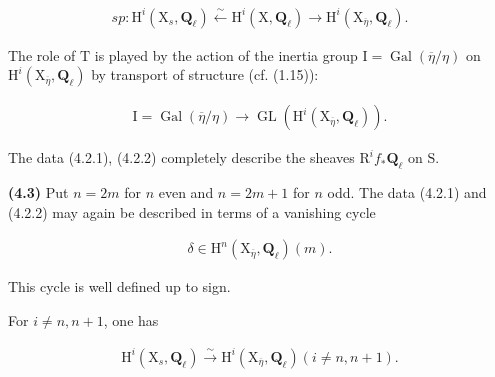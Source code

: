 \documentclass[10pt,leqno]{article}
\begin{document}
\begin{equation*}\begin{gathered}\mathit{sp} : \mathrm{H}^{i}(\mathrm{X}_{s},\mathbf{Q}_{\ell }) \xleftarrow{\sim } \mathrm{H}^{i}(\mathrm{X},\mathbf{Q}_{\ell }) \longrightarrow  \mathrm{H}^{i}(\mathrm{X}_{\overline{\eta }},\mathbf{Q}_{\ell }).\end{gathered}\tag{4.2.1}\end{equation*}

\noindent The role of \(\mathrm{T}\) is played by the action of the inertia group \(\mathrm{I}=\operatorname{Gal}(\overline{\eta }/\eta )\) on \(\mathrm{H}^{i}(\mathrm{X}_{\overline{\eta }},\mathbf{Q}_{\ell })\) by transport of structure (cf. (1.15)):\par

\begin{equation*}\begin{gathered}\mathrm{I}=\operatorname{Gal}(\overline{\eta }/\eta ) \longrightarrow  \operatorname{GL}(\mathrm{H}^{i}(\mathrm{X}_{\overline{\eta }},\mathbf{Q}_{\ell })).\end{gathered}\tag{4.2.2}\end{equation*}

\noindent The data (4.2.1), (4.2.2) completely describe the sheaves \(\mathrm{R}^{i} f_{*}\mathbf{Q}_{\ell }\) on \(\mathrm{S}\).\par

\noindent \textbf{(4.3)} Put \(n=2m\) for \(n\) even and \(n=2m+1\) for \(n\) odd. The data (4.2.1) and (4.2.2) may again be described in terms of a vanishing cycle\par

\begin{equation*}\begin{gathered}\delta \in \mathrm{H}^{n}(\mathrm{X}_{\overline{\eta }},\mathbf{Q}_{\ell })(m).\end{gathered}\tag{4.3.1}\end{equation*}

\noindent This cycle is well defined up to sign.\par

\noindent For \(i\ne n,n+1\), one has\par

\begin{equation*}\begin{gathered}\mathrm{H}^{i}(\mathrm{X}_{s},\mathbf{Q}_{\ell }) \xrightarrow{\sim } \mathrm{H}^{i}(\mathrm{X}_{\overline{\eta }},\mathbf{Q}_{\ell })    (i\ne n,n+1).\end{gathered}\tag{4.3.2}\end{equation*}
\end{document}
